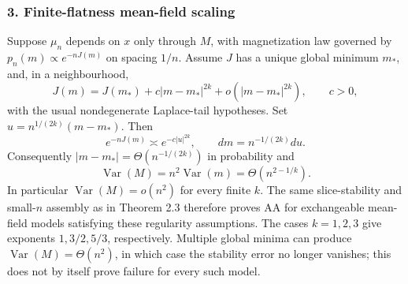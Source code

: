 \subsubsection{3. Finite-flatness mean-field scaling}\label{finite-flatness-mean-field-scaling}

Suppose \(\mu_n\) depends on \(x\) only through \(M\), with magnetization law governed by \(p_n(m)\propto e^{-nJ(m)}\) on spacing \(1/n\). Assume \(J\) has a unique global minimum \(m_*\), and, in a neighbourhood,
\[J(m)=J(m_*)+c|m-m_*|^{2k}+o(|m-m_*|^{2k}),\qquad c>0,\]
with the usual nondegenerate Laplace-tail hypotheses. Set \(u=n^{1/(2k)}(m-m_*)\). Then
\[e^{-nJ(m)}\asymp e^{-c|u|^{2k}},\qquad dm=n^{-1/(2k)}du.\]
Consequently \(|m-m_*|=\Theta(n^{-1/(2k)})\) in probability and
\[\operatorname{Var}(M)=n^2\operatorname{Var}(m)=\Theta(n^{2-1/k}).\]
In particular \(\operatorname{Var}(M)=o(n^2)\) for every finite \(k\). The same slice-stability and small-\(n\) assembly as in Theorem 2.3 therefore proves AA for exchangeable mean-field models satisfying these regularity assumptions. The cases \(k=1,2,3\) give exponents \(1,3/2,5/3\), respectively. Multiple global minima can produce \(\operatorname{Var}(M)=\Theta(n^2)\), in which case the stability error no longer vanishes; this does not by itself prove failure for every such model.
